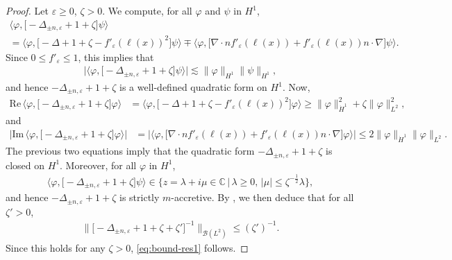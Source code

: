 \documentclass[12pt]{article}
\theoremstyle{plain}
\begin{document}
	
	\begin{proof}
Let $\varepsilon\ge0$, $\zeta>0$. We compute, for all $\varphi$ and $\psi$ in $H^1$, 
\begin{multline*}
    \big\langle\varphi,\big[-\Delta_{\pm n,\varepsilon}+1+\zeta\big]\psi\big\rangle\\
    =\big\langle\varphi,\big[-\Delta+1+\zeta-f'_\varepsilon(\ell(x))^2\big]\psi\big\rangle\mp\big\langle\varphi,\big[\nabla\cdot n f'_\varepsilon(\ell(x))+f'_\varepsilon(\ell(x))n\cdot\nabla\big]\psi\big\rangle.
\end{multline*}
Since $0\le f'_\varepsilon\le1$, this implies that
\begin{align*}
    \big|\big\langle\varphi,\big[-\Delta_{\pm n,\varepsilon}+1+\zeta\big]\psi\big\rangle\big|\lesssim\|\varphi\|_{H^1}\|\psi\|_{H^1},
\end{align*}
and hence $-\Delta_{\pm n,\varepsilon}+1+\zeta$ is a well-defined quadratic form on $H^1$. Now,
\begin{align*}
    \mathrm{Re} \, \big\langle\varphi,\big[-\Delta_{\pm n,\varepsilon}+1+\zeta\big]\varphi\big\rangle&=\big\langle\varphi,\big[-\Delta+1+\zeta-f'_\varepsilon(\ell(x))^2\big]\varphi\big\rangle\ge\|\varphi\|_{\dot{H}^1}^2+\zeta\|\varphi\|_{L^2}^2,
\end{align*}
and
\begin{align*}
    \big|\mathrm{Im} \, \big\langle\varphi,\big[-\Delta_{\pm n,\varepsilon}+1+\zeta\big]\varphi\big\rangle\big|&=\big|\big\langle\varphi,\big[\nabla\cdot n f'_\varepsilon(\ell(x))+f'_\varepsilon(\ell(x))n\cdot\nabla\big]\varphi\big\rangle\big|\le2\|\varphi\|_{\dot{H}^1}\|\varphi\|_{L^2}.
\end{align*}
The previous two equations imply that the quadratic form $-\Delta_{\pm n,\varepsilon}+1+\zeta$ is closed on $H^1$. Moreover, for all $\varphi$ in $H^1$,
\begin{align*}
    \big\langle\varphi,\big[-\Delta_{\pm n,\varepsilon}+1+\zeta\big]\psi\big\rangle\in\big\{z=\lambda+i\mu\in\mathbb{C}\,|\,\lambda\ge0,\, |\mu|\le \zeta^{-\frac12}\lambda\big\},
\end{align*}
and hence $-\Delta_{\pm n,\varepsilon}+1+\zeta$ is strictly $m$-accretive. By \cite[Theorem VIII.17]{ReedSimon1}, we then deduce that 
for all $\zeta'>0$,
\begin{align*}
    \big\|\big[-\Delta_{\pm n,\varepsilon}+1+\zeta+\zeta'\big]^{-1}\big\|_{\mathcal{B}(L^2)}\le (\zeta')^{-1}.
\end{align*}
Since this holds for any $\zeta>0$, \eqref{eq:bound-res1} follows.


\end{proof}
\end{document}

